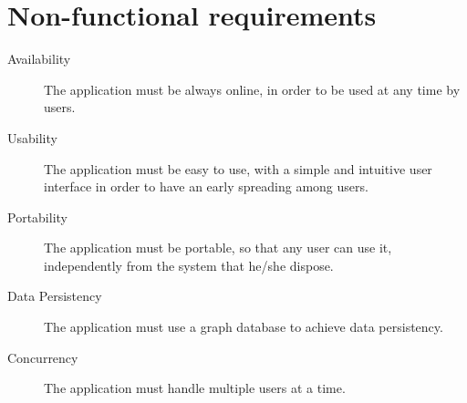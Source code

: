 \section{Non-functional requirements}\label{sec:nonfunctionalrequirements}

\begin{description}

    \item [Availability] The application must be always online, in order to be used at any time by users.
    \item [Usability] The application must be easy to use, with a simple and intuitive user interface in order to have an early spreading among users.
    \item [Portability] The application must be portable, so that any user can use it,
    independently from the system that he/she dispose.
    \item [Data Persistency] The application must use a graph database to
    achieve data persistency.
    \item [Concurrency] The application must handle multiple users at a time.

\end{description}